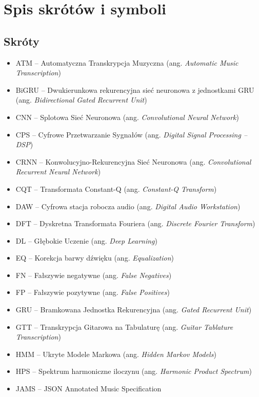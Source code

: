 \chapter{Spis skrótów i symboli}
\label{chap:skroty_symbole}

\section*{Skróty}
\begin{itemize}
    \item ATM – Automatyczna Transkrypcja Muzyczna (ang. \textit{Automatic Music Transcription})
    \item BiGRU – Dwukierunkowa rekurencyjna sieć neuronowa z jednostkami GRU (ang. \textit{Bidirectional Gated Recurrent Unit})
    \item CNN – Splotowa Sieć Neuronowa (ang. \textit{Convolutional Neural Network})
    \item CPS – Cyfrowe Przetwarzanie Sygnałów (ang. \textit{Digital Signal Processing – DSP})
    \item CRNN – Konwolucyjno-Rekurencyjna Sieć Neuronowa (ang. \textit{Convolutional Recurrent Neural Network})
    \item CQT – Transformata Constant-Q (ang. \textit{Constant-Q Transform})
    \item DAW – Cyfrowa stacja robocza audio (ang. \textit{Digital Audio Workstation})
    \item DFT – Dyskretna Transformata Fouriera (ang. \textit{Discrete Fourier Transform})
    \item DL – Głębokie Uczenie (ang. \textit{Deep Learning})
    \item EQ – Korekcja barwy dźwięku (ang. \textit{Equalization})
    \item FN – Fałszywie negatywne (ang. \textit{False Negatives})
    \item FP – Fałszywie pozytywne (ang. \textit{False Positives})
    \item GRU – Bramkowana Jednostka Rekurencyjna (ang. \textit{Gated Recurrent Unit})
    \item GTT – Transkrypcja Gitarowa na Tabulaturę (ang. \textit{Guitar Tablature Transcription})
    \item HMM – Ukryte Modele Markowa (ang. \textit{Hidden Markov Models})
    \item HPS – Spektrum harmoniczne iloczynu (ang. \textit{Harmonic Product Spectrum})
    \item JAMS – JSON Annotated Music Specification

\end{itemize}
